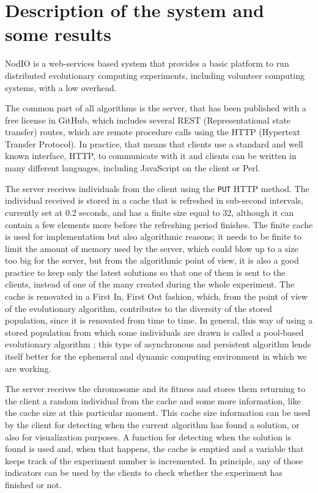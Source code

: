 \documentclass{sig-alternate}
\begin{document}
\section{Description of the system and some results}
\label{sec:res}

NodIO \cite{2016arXiv160101607M,DBLP:conf/gecco/GuervosG15} is a
web-services based system that provides a basic platform to run distributed evolutionary
computing experiments, including volunteer computing systems, with a
low overhead. 

The common part of all algorithms is the server, that has been
published with a free license in GitHub, which includes several REST
(Representational state transfer)
routes, which are remote procedure calls using the HTTP (Hypertext
Transfer Protocol). In practice, that means that clients use a
standard and well known interface, HTTP, to communicate with it and
clients can be written in many different languages, including
JavaScript on the client  or Perl. 

The server receives individuals from the client using the {\tt PUT}
HTTP method. The individual received is stored in a cache that is
refreshed in sub-second intervals, currently set at 0.2 seconds, and
has a finite size equal to 32, although it can contain a few elements
more before the refreshing period finishes. The finite cache is used
for implementation but also algorithmic reasons; it needs to be finite
to limit the amount of memory used by the server, which could blow up
to a size too big for the server, but from the algorithmic point of
view, it is also  a good practice to keep only the latest solutions so
that one of them is sent to the clients, instead of one of the many created
during the whole experiment. 
The cache is renovated in a First
In, First Out fashion, which, from the point of view of the
evolutionary algorithm, contributes to the diversity of the stored
population, since it is renovated from time to time. In general, this way of using a stored population from
which some individuals are drawn is called a pool-based evolutionary
algorithm
\cite{pool:ga,bollini1999distributed,gong2015distributed,
  sofea:evopar2012,DBLP:journals/grid/ValdezTGVO15,garcia2014unreliable,LNCS86720702,
  DBLP:conf/3pgcic/GuervosMFEL12,sofea:naco}; this type of
asynchronous and persistent algorithm lends itself better for the
ephemeral and dynamic computing environment in which we are
working. 

The server receives the chromosome and its fitness and
 stores them returning to the client a random individual from the
cache and some more information, like the cache size at this
particular moment. This cache size information can be used by the
client for detecting when the current algorithm has found a solution,
or also for visualization purposes. A function for detecting when the
solution is found is used and, when that happens, the cache is emptied
and a variable that keeps track of the experiment number is
incremented. In principle, any of those indicators can be used by the
clients to check whether the experiment has finished or not. 
\end{document}
